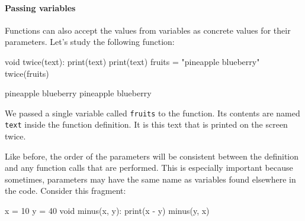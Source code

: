 \paragraph{Passing variables}

Functions can also accept the values from variables as concrete values for their parameters. Let's study the following function:

\begin{minipage}[t]{0.5\textwidth}
\begin{nllisting}
void twice(text):
    print(text)
    print(text)
fruits = "pineapple blueberry"
twice(fruits)
\end{nllisting}
\end{minipage}
\begin{minipage}[t]{0.5\textwidth}
\begin{listing}
pineapple blueberry
pineapple blueberry
\end{listing}
\end{minipage}

We passed a single variable called \texttt{fruits} to the function. Its contents are named \texttt{text} inside the function definition. It is this text that is printed on the screen twice.

%
%

Like before, the order of the parameters will be consistent between the definition and any function calls that are performed. This is especially important because sometimes, parameters may have the same name as variables found elsewhere in the code. Consider this fragment:

\begin{nnflisting}
x = 10
y = 40
void minus(x, y):
    print(x - y)
minus(y, x)
\end{nnflisting}

